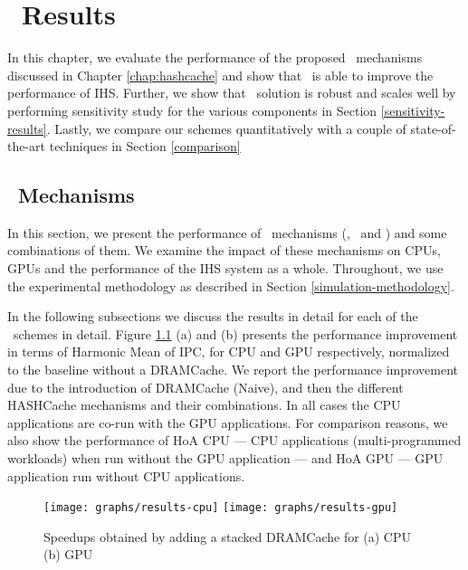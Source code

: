 \chapter{\cachename\ Results} \label{chap:results}
In this chapter, we evaluate the performance of the proposed \cachename\ mechanisms discussed in Chapter \ref{chap:hashcache} and show that \cachename\ is able to improve the performance of IHS. Further, we show that \cachename\ solution is robust and scales well by performing sensitivity study for the various components in Section \ref{sensitivity-results}. Lastly, we compare our schemes quantitatively with a couple of state-of-the-art techniques in Section \ref{comparison}

\section{\cachename\ Mechanisms}
In this section, we present the performance of \cachename\ mechanisms (\prioname, \bypassname\ and \chaining) and some combinations of them. We examine the impact of these mechanisms on CPUs, GPUs and the performance of the IHS system as a whole. Throughout, we use the experimental methodology as described in Section \ref{simulation-methodology}. 
\par In the following subsections we discuss the results in detail for each of the \cachename\ schemes in detail. Figure \ref{results-speedup} (a) and (b) presents the performance improvement in terms of Harmonic Mean of IPC, for CPU and GPU respectively, normalized to the baseline without a DRAMCache. We report the performance improvement due to the introduction of DRAMCache (Naive),  and then the different HASHCache mechanisms  and their combinations. In all cases the CPU applications are co-run with the GPU applications. For comparison reasons, we also show the performance of HoA CPU --- CPU applications (multi-programmed workloads) when run without the GPU application --- and  HoA GPU --- GPU application run without CPU applications.

\begin{figure}[htb]
	\centering
	\texttt{[image: graphs/results-cpu]}
	\texttt{[image: graphs/results-gpu]}
	\caption{Speedups obtained by adding a stacked DRAMCache for (a) CPU (b) GPU}
	\label{results-speedup}
\end{figure}

